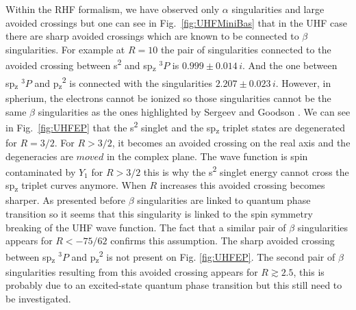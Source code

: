 \documentclass[11pt,a4paper]{article}
\begin{document}
Within the RHF formalism, we have observed only $\alpha$ singularities and large avoided crossings but one can see in Fig.~\ref{fig:UHFMiniBas} that in the UHF case there are sharp avoided crossings which are known to be connected to $\beta$ singularities. For example at $R=10$ the pair of singularities connected to the avoided crossing between s\textsuperscript{2} and sp\textsubscript{z} $^{3}P$ is $0.999\pm0.014\,i$. And the one between sp\textsubscript{z} $^{3}P$ and p\textsubscript{z}\textsuperscript{2} is connected with the singularities $2.207\pm0.023\,i$. However, in spherium, the electrons cannot be ionized so those singularities cannot be the same $\beta$ singularities as the ones highlighted by Sergeev and Goodson \cite{Sergeev_2005}. We can see in Fig.~\ref{fig:UHFEP} that the s\textsuperscript{2} singlet and the sp\textsubscript{z} triplet states are degenerated for $R=3/2$. For $R>3/2$, it becomes an avoided crossing on the real axis and the degeneracies are $moved$ in the complex plane. The wave function is spin contaminated by $Y_1$ for $R>3/2$ this is why the s\textsuperscript{2} singlet energy cannot cross the sp\textsubscript{z} triplet curves anymore. When $R$ increases this avoided crossing becomes sharper. As presented before $\beta$ singularities are linked to quantum phase transition so it seems that this singularity is linked to the spin symmetry breaking of the UHF wave function. The fact that a similar pair of $\beta$ singularities appears for $R<-75/62$ confirms this assumption. The sharp avoided crossing between sp\textsubscript{z} $^{3}P$ and p\textsubscript{z}\textsuperscript{2} is not present on Fig. \ref{fig:UHFEP}. The second pair of $\beta$ singularities resulting from this avoided crossing appears for $R\gtrsim 2.5$, this is probably due to an excited-state quantum phase transition but this still need to be investigated. 
\end{document}

